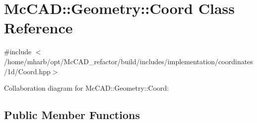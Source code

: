 \hypertarget{classMcCAD_1_1Geometry_1_1Coord}{}\section{Mc\+C\+AD\+:\+:Geometry\+:\+:Coord Class Reference}
\label{classMcCAD_1_1Geometry_1_1Coord}


{\ttfamily \#include $<$/home/mharb/opt/\+Mc\+C\+A\+D\+\_\+refactor/build/includes/implementation/coordinates/1d/\+Coord.\+hpp$>$}



Collaboration diagram for Mc\+C\+AD\+:\+:Geometry\+:\+:Coord\+:
\subsection*{Public Member Functions}
